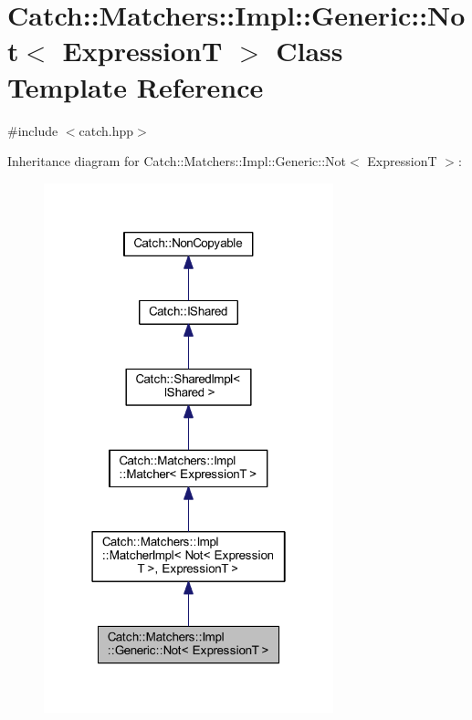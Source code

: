\hypertarget{class_catch_1_1_matchers_1_1_impl_1_1_generic_1_1_not}{}\section{Catch\+:\+:Matchers\+:\+:Impl\+:\+:Generic\+:\+:Not$<$ ExpressionT $>$ Class Template Reference}
\label{class_catch_1_1_matchers_1_1_impl_1_1_generic_1_1_not}


{\ttfamily \#include $<$catch.\+hpp$>$}



Inheritance diagram for Catch\+:\+:Matchers\+:\+:Impl\+:\+:Generic\+:\+:Not$<$ ExpressionT $>$\+:\nopagebreak
\begin{figure}[H]
\begin{center}
\leavevmode
\includegraphics[width=238pt]{class_catch_1_1_matchers_1_1_impl_1_1_generic_1_1_not__inherit__graph}
\end{center}
\end{figure}


